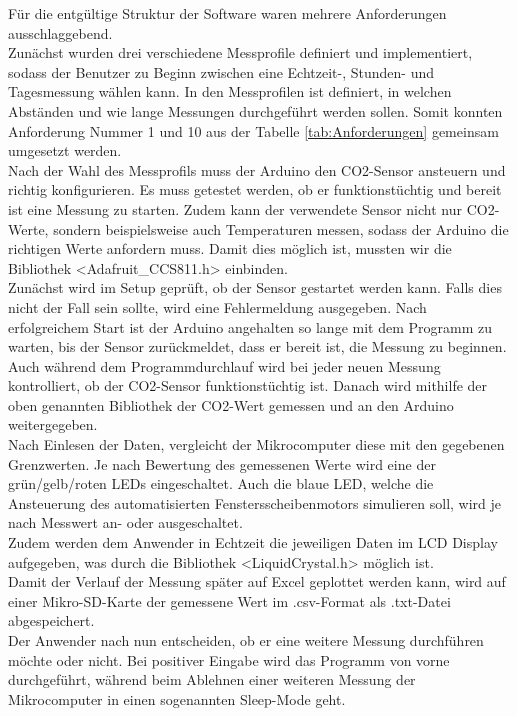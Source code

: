\label{Softwaremplementation}



Für die entgültige Struktur der Software waren mehrere Anforderungen ausschlaggebend. \\
Zunächst wurden drei verschiedene Messprofile definiert und implementiert, sodass der Benutzer zu Beginn zwischen eine Echtzeit-, Stunden- und Tagesmessung wählen kann. In den Messprofilen ist definiert, in welchen Abständen und wie lange Messungen durchgeführt werden sollen. Somit konnten Anforderung Nummer 1 und 10 aus der Tabelle \ref{tab:Anforderungen} gemeinsam umgesetzt werden. \\
Nach der Wahl des Messprofils muss der Arduino den CO2-Sensor ansteuern und richtig konfigurieren. Es muss getestet werden, ob er funktionstüchtig und bereit ist eine Messung zu starten. Zudem kann der verwendete Sensor nicht nur CO2-Werte, sondern beispielsweise auch Temperaturen messen, sodass der Arduino die richtigen Werte anfordern muss. Damit dies möglich ist, mussten wir die Bibliothek <Adafruit\_CCS811.h> einbinden. \\
Zunächst wird im Setup geprüft, ob der Sensor gestartet werden kann. Falls dies nicht der Fall sein sollte, wird eine Fehlermeldung ausgegeben. Nach erfolgreichem Start ist der Arduino angehalten so lange mit dem Programm zu warten, bis der Sensor zurückmeldet, dass er bereit ist, die Messung zu beginnen. \\
Auch während dem Programmdurchlauf wird bei jeder neuen Messung kontrolliert, ob der CO2-Sensor funktionstüchtig ist. Danach wird mithilfe der oben genannten Bibliothek der CO2-Wert gemessen und an den Arduino weitergegeben. \\
Nach Einlesen der Daten, vergleicht der Mikrocomputer diese mit den gegebenen Grenzwerten. Je nach Bewertung des gemessenen Werte wird eine der grün/gelb/roten LEDs eingeschaltet. Auch die blaue LED, welche die Ansteuerung des automatisierten Fenstersscheibenmotors simulieren soll, wird je nach Messwert an- oder ausgeschaltet. \\
Zudem werden dem Anwender in Echtzeit die jeweiligen Daten im LCD Display aufgegeben, was durch die Bibliothek <LiquidCrystal.h> möglich ist. \\
Damit der Verlauf der Messung später auf Excel geplottet werden kann, wird auf einer Mikro-SD-Karte der gemessene Wert im .csv-Format als .txt-Datei abgespeichert. \\ %
Der Anwender nach nun entscheiden, ob er eine weitere Messung durchführen möchte oder nicht. Bei positiver Eingabe wird das Programm von vorne durchgeführt, während beim Ablehnen einer weiteren Messung der Mikrocomputer in einen sogenannten Sleep-Mode geht. %
